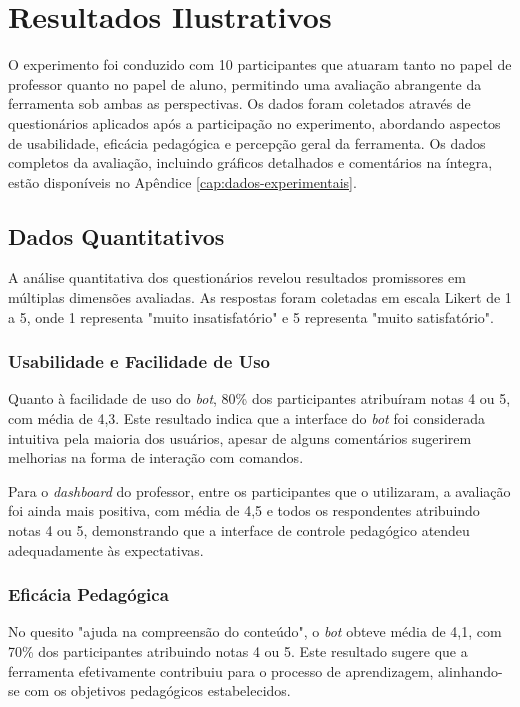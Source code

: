 \section{Resultados Ilustrativos}
\label{sec:resultados}

O experimento foi conduzido com 10 participantes que atuaram tanto no papel de
professor quanto no papel de aluno, permitindo uma avaliação abrangente da
ferramenta sob ambas as perspectivas. Os dados foram coletados através de
questionários aplicados após a participação no experimento, abordando aspectos
de usabilidade, eficácia pedagógica e percepção geral da ferramenta. Os dados
completos da avaliação, incluindo gráficos detalhados e comentários na íntegra,
estão disponíveis no Apêndice \ref{cap:dados-experimentais}.

\subsection{Dados Quantitativos}
\label{subsec:dados-quant}

A análise quantitativa dos questionários revelou resultados promissores em
múltiplas dimensões avaliadas. As respostas foram coletadas em escala Likert de
1 a 5, onde 1 representa "muito insatisfatório" e 5 representa "muito
satisfatório".

\subsubsection{Usabilidade e Facilidade de Uso}

Quanto à facilidade de uso do \textit{bot}, 80\% dos participantes atribuíram
notas 4 ou 5, com média de 4,3. Este resultado indica que a interface do
\textit{bot} foi considerada intuitiva pela maioria dos usuários, apesar de
alguns comentários sugerirem melhorias na forma de interação com comandos.

Para o \textit{dashboard} do professor, entre os participantes que o utilizaram,
a avaliação foi ainda mais positiva, com média de 4,5 e todos os respondentes
atribuindo notas 4 ou 5, demonstrando que a interface de controle pedagógico
atendeu adequadamente às expectativas.

\subsubsection{Eficácia Pedagógica}

No quesito "ajuda na compreensão do conteúdo", o \textit{bot} obteve média de
4,1, com 70\% dos participantes atribuindo notas 4 ou 5. Este resultado sugere
que a ferramenta efetivamente contribuiu para o processo de aprendizagem,
alinhando-se com os objetivos pedagógicos estabelecidos.

